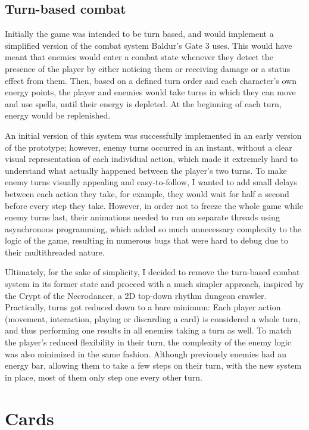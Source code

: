 \subsection{Turn-based combat}

Initially the game was intended to be turn based, and would implement a simplified version of the combat system Baldur's Gate 3 uses. This would have meant that enemies would enter a combat state whenever they detect the presence of the player by either noticing them or receiving damage or a status effect from them. Then, based on a defined turn order and each character's own energy points, the player and enemies would take turns in which they can move and use spells, until their energy is depleted. At the beginning of each turn, energy would be replenished. 

An initial version of this system was successfully implemented in an early version of the prototype; however, enemy turns occurred in an instant, without a clear visual representation of each individual action, which made it extremely hard to understand what actually happened between the player's two turns.
To make enemy turns visually appealing and easy-to-follow, I wanted to add small delays between each action they take, for example, they would wait for half a second before every step they take. However, in order not to freeze the whole game while enemy turns last, their animations needed to run on separate threads using asynchronous programming, which added so much unnecessary complexity to the logic of the game, resulting in numerous bugs that were hard to debug due to their multithreaded nature.

Ultimately, for the sake of simplicity, I decided to remove the turn-based combat system in its former state and proceed with a much simpler approach, inspired by the Crypt of the Necrodancer\cite{necrodancer2015}, a 2D top-down rhythm dungeon crawler. Practically, turns got reduced down to a bare minimum: Each player action (movement, interaction, playing or discarding a card) is considered a whole turn, and thus performing one results in all enemies taking a turn as well. To match the player's reduced flexibility in their turn, the complexity of the enemy logic was also minimized in the same fashion. Although previously enemies had an energy bar, allowing them to take a few steps on their turn, with the new system in place, most of them only step one every other turn.



\section{Cards}

